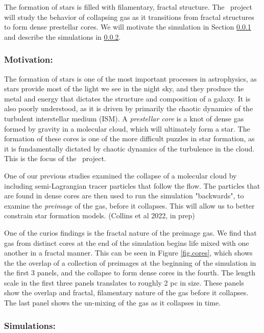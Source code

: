 
The formation of stars is filled with filamentary, fractal structure.  The
\nameCores\ project will study the behavior of collapsing gas as it transitions
from fractal structures to form dense prestellar cores.  We will motivate the
simulation in Section \ref{subsec.cores_motivate} and describe the simulations
in \ref{subsec.cores_sims}.


\subsubsection{Motivation: \nameCores}
\label{subsec.cores_motivate}
The formation of stars is one of the most important processes in astrophysics,
as stars provide most of the light we see in the night sky, and they produce the metal and energy
that dictates the structure and composition of a galaxy.  It is also poorly
understood, as it is driven by primarily the chaotic dynamics of the turbulent
interstellar medium (ISM).   A \emph{prestellar core} is a knot of dense gas
formed by gravity in a molecular cloud, which will ultimately form a star.  The
formation of these cores is one of the more difficult puzzles in star formation,
as it is fundamentally dictated by chaotic dynamics of the turbulence in the
cloud.  This is the focus of the \nameCores\ project.

One of our previous studies examined the collapse of a molecular cloud by
including semi-Lagrangian tracer particles that follow the flow.  The particles
that are found in dense cores are then used to run the simulation "backwards",
to examine the \emph{preimage} of the gas, before it collapses.  This will allow
us to better constrain star formation models.  (Collins et al 2022, in prep)

One of the curios findings is the fractal nature of the preimage gas.  We find
that gas from distinct cores at the end of the simulation begins life mixed with
one another in a fractal manner. This can be seen in Figure
\ref{fig.cores}, which shows the the overlap of a collection of preimages at the
beginning of the simulation in the first 3 panels, and the
collapse to form dense cores in the fourth.  The length scale in the first three panels translates to
roughly 2 pc in size.  These panels show the overlap and fractal, filamentary nature of
the gas before it collapses.  The
last panel shows the un-mixing of the gas as it collapses in time.

\subsubsection{Simulations: \nameCores}
\label{subsec.cores_sims}

